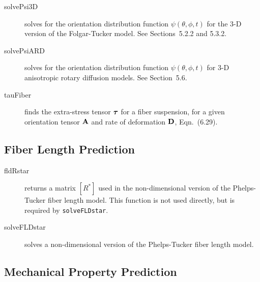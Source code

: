 \documentclass[11pt]{article}
\begin{document}
\begin{description}
    \item[solvePsi3D]{solves for the orientation distribution function $\psi( \theta, \phi, t)$ for the 3-D version of the Folgar-Tucker model.  See Sections~5.2.2 and 5.3.2.}
    
    \item[solvePsiARD]{solves for the orientation distribution function $\psi( \theta, \phi, t)$ for 3-D anisotropic rotary diffusion models.  See Section~5.6.}
    
    \item[tauFiber]{finds the extra-stress tensor $\boldsymbol{\tau}$ for a fiber suspension, for a given orientation tensor $\mathbf{A}$ and rate of deformation $\mathbf{D}$, Eqn.~(6.29).}
    
\end{description}

\subsection{Fiber Length Prediction}

\begin{description}

    \item[fldRstar]{returns a matrix $[R^*]$ used in the non-dimensional version of the Phelps-Tucker fiber length model.  This function is not used directly, but is required by \texttt{solveFLDstar}.}
    
    \item[solveFLDstar]{solves a non-dimensional version of the Phelps-Tucker fiber length model.}
    
\end{description}

\subsection{Mechanical Property Prediction}
\end{document}
